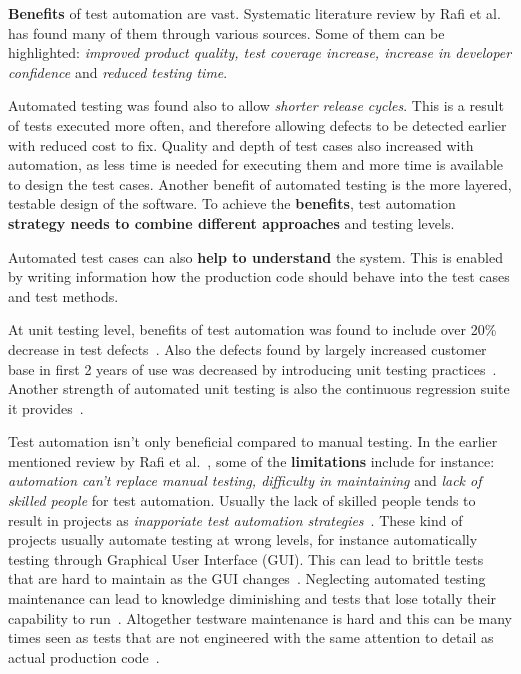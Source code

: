     \textbf{Benefits} of test automation are vast. Systematic literature review by Rafi et al.~\cite{rafi2012benefits} has found many
    of them through various sources. Some of them can be highlighted: \textit{improved product quality, test coverage increase,
    increase in developer confidence} and \textit{reduced testing time}.

    Automated testing was found also to allow \textit{shorter release cycles}. This is a result of
    tests executed more often, and therefore allowing defects to be detected earlier with reduced cost to fix.
    Quality and depth of test cases also increased with automation, as less time is needed for executing them and more time is available
    to design the test cases. Another benefit of automated testing is the more layered, testable design of the software.
    To achieve the \textbf{benefits}, test automation \textbf{strategy needs to combine different approaches} and testing levels. ~\cite{berner2005observations}

    Automated test cases can also \textbf{help to understand} the system. This is enabled by writing information how the production code should behave
    into the test cases and test methods. ~\cite{langr2015pragmatic,chelimsky2010rspec,kapelonis2016java}

    At unit testing level, benefits of test automation was found to include over 20\% decrease in test defects~\cite{williams2009effectiveness}.
    Also the defects found by largely increased customer base in first 2 years of use was decreased by introducing unit testing practices~\cite{williams2009effectiveness}.
    Another strength of automated unit testing is also the continuous regression suite it provides~\cite{runeson2006survey}.

    Test automation isn't only beneficial compared to manual testing. In the earlier mentioned review by Rafi et al.~\cite{rafi2012benefits},
    some of the \textbf{limitations} include for instance: \textit{automation can't replace manual testing, difficulty in maintaining}
    and \textit{lack of skilled people} for test automation. Usually the lack of skilled people tends to result in projects as
    \textit{inapporiate test automation strategies}~\cite{rafi2012benefits,berner2005observations}. These kind of projects
    usually automate testing at wrong levels, for instance automatically testing through Graphical User Interface (GUI). This
    can lead to brittle tests that are hard to maintain as the GUI changes~\cite{berner2005observations}. Neglecting automated
    testing maintenance can lead to knowledge diminishing and tests that lose totally their capability to run~\cite{berner2005observations}.
    Altogether testware maintenance is hard and this can be many times seen as tests that are not engineered
    with the same attention to detail as actual production code~\cite{berner2005observations}.

